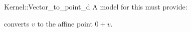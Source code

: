\begin{ccRefFunctionObjectConcept}{Kernel::Vector_to_point_d}
A model for this must provide:


{converts $v$ to the affine point $0+v$.}

\end{ccRefFunctionObjectConcept}
